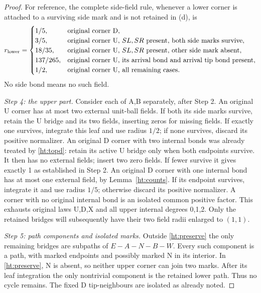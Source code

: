 \begin{proof}
For reference, the complete side-field rule, whenever a lower corner
is attached to a surviving side mark and is not retained in (d), is
\begin{equation}\label{ht:lowerrule}
 r_{\rm lower}=\begin{cases}
 1/5,&\text{original corner D},\\
 3/5,&\text{original corner U, }SL,SR\text{ present, both side marks survive},\\
 18/35,&\text{original corner U, }SL,SR\text{ present, other side mark absent},\\
 137/265,&\text{original corner U, its arrival bond and arrival tip bond present},\\
 1/2,&\text{original corner U, all remaining cases}.
 \end{cases}
\end{equation}
No side bond means no such field.

\emph{Step 4: the upper part.}
Consider each of A,B separately, after Step 2. An original U corner
has at most two external unit-ball fields. If both its side marks
survive, retain the U bridge and its two fields, inserting zeros for
missing fields. If exactly one survives, integrate this leaf and use
radius \(1/2\); if none survives, discard its positive normalizer.
An original D corner with two internal bonds was already treated by
\eqref{ht:topd}: retain its active U bridge only when both endpoints
survive. It then has no external fields; insert two zero fields.
If fewer survive it gives exactly 1 as established in Step 2.
An original D corner with one internal bond has at most one external
field, by Lemma~\ref{ht:counts}. If its endpoint survives, integrate
it and use radius \(1/5\); otherwise discard its positive normalizer.
A corner with no original internal bond is an isolated common positive
factor. This exhausts original laws U,D,X and all upper internal degrees
0,1,2. Only the retained bridges will subsequently have their two
field radii enlarged to \((1,1)\).

\emph{Step 5: path components and isolated marks.}
Outside \eqref{ht:preserve} the only remaining bridges are subpaths of
\(E-A-N-B-W\). Every such component is a path, with marked endpoints
and possibly marked N in its interior. In \eqref{ht:preserve}, N is
absent, so neither upper corner can join two marks. After its leaf
integration the only nontrivial component is the retained lower path.
Thus no cycle remains. The fixed D tip-neighbours are isolated as
already noted.


\end{proof}

